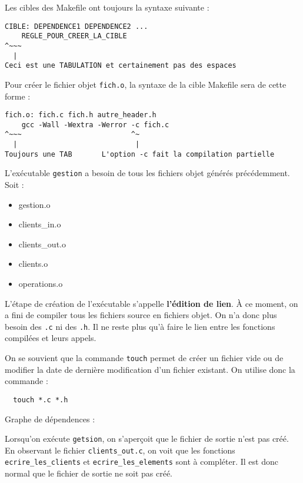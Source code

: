 \documentclass[10pt]{article}
\begin{document}
\begin{enumerate}[label=\textbf{[\alph*]}]
\item Les cibles des Makefile ont toujours la syntaxe suivante :

\begin{verbatim}
CIBLE: DEPENDENCE1 DEPENDENCE2 ...
    REGLE_POUR_CREER_LA_CIBLE
^~~~
  |
Ceci est une TABULATION et certainement pas des espaces
\end{verbatim}

  Pour créer le fichier objet \texttt{fich.o}, la syntaxe de la cible
  Makefile sera de cette forme :

\begin{verbatim}
fich.o: fich.c fich.h autre_header.h
    gcc -Wall -Wextra -Werror -c fich.c
^~~~                          ^~
  |                            |
Toujours une TAB       L'option -c fait la compilation partielle
\end{verbatim}

\item L'exécutable \texttt{gestion} a besoin de tous les fichiers
  objet générés précédemment. Soit :

  \begin{itemize}
  \item gestion.o
  \item clients\_in.o
  \item clients\_out.o
  \item clients.o
  \item operations.o
  \end{itemize}

  L'étape de création de l'exécutable s'appelle
  \textbf{l'édition de lien}. À ce moment, on a fini de compiler tous
  les fichiers source en fichiers objet. On n'a donc plus besoin des
  \texttt{.c} ni des \texttt{.h}. Il ne reste plus qu'à faire le lien
  entre les fonctions compilées et leurs appels.

\item On se souvient que la commande \texttt{touch} permet de créer un
  fichier vide ou de modifier la date de dernière modification d'un
  fichier existant. On utilise donc la commande :

\begin{verbatim}
  touch *.c *.h
\end{verbatim}

\newpage
\item Graphe de dépendences :

  

\item Lorsqu'on exécute \texttt{getsion}, on s'aperçoit que le fichier
  de sortie n'est pas créé. En observant le fichier
  \texttt{clients\_out.c}, on voit que les fonctions
  \texttt{ecrire\_les\_clients} et \texttt{ecrire\_les\_elements} sont
  à compléter. Il est donc normal que le fichier de sortie ne soit pas
  créé.


\end{enumerate}
\end{document}
